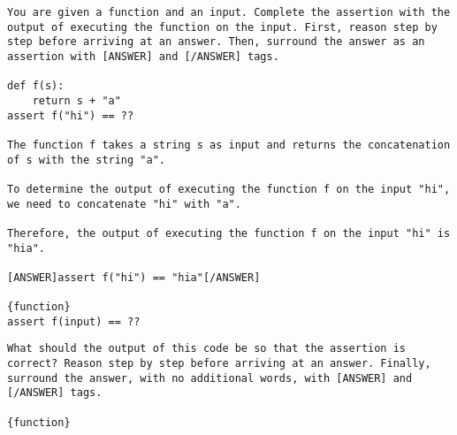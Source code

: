 \begin{lstlisting}[caption={CoT output prediction prompt (Code Llama)},label={lst:benchmark-cot-output-prompt-llama}, captionpos=t, breaklines=true]
You are given a function and an input. Complete the assertion with the output of executing the function on the input. First, reason step by step before arriving at an answer. Then, surround the answer as an assertion with [ANSWER] and [/ANSWER] tags.

def f(s):
    return s + "a"
assert f("hi") == ??

The function f takes a string s as input and returns the concatenation of s with the string "a".

To determine the output of executing the function f on the input "hi", we need to concatenate "hi" with "a". 

Therefore, the output of executing the function f on the input "hi" is "hia".

[ANSWER]assert f("hi") == "hia"[/ANSWER]

{function}
assert f(input) == ??
\end{lstlisting}

\begin{lstlisting}[caption={CoT output prediction prompt (GPT)},label={lst:benchmark-cot-output-prompt-gpt}, captionpos=t, breaklines=true]
What should the output of this code be so that the assertion is correct? Reason step by step before arriving at an answer. Finally, surround the answer, with no additional words, with [ANSWER] and [/ANSWER] tags.

{function}
\end{lstlisting}